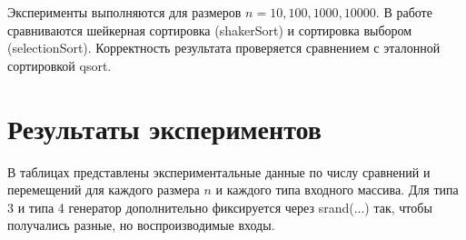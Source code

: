 \documentclass[a4paper,12pt]{article}
\newcommand{\code}[1]{{\ttfamily #1}}
\begin{document}
Эксперименты выполняются для размеров $n = 10, 100, 1000, 10000$. В работе сравниваются шейкерная сортировка (\code{shakerSort}) и сортировка выбором (\code{selectionSort}). Корректность результата проверяется сравнением с эталонной сортировкой \code{qsort}.

\section{Результаты экспериментов}

В таблицах представлены экспериментальные данные по числу сравнений и перемещений для каждого размера $n$ и каждого типа входного массива. Для типа 3 и типа 4 генератор дополнительно фиксируется через \code{srand(...)} так, чтобы получались разные, но воспроизводимые входы.

\begin{table}[H]
\centering
\small
\renewcommand{\arraystretch}{1.15}
\setlength{\tabcolsep}{6pt}
\caption{Таблица 1: Результаты работы Shaker Sort}
\end{table}
\end{document}
